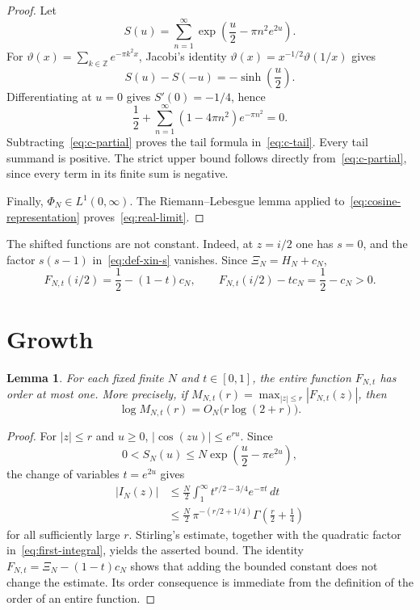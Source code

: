 \documentclass[11pt,a4paper]{amsart}
\newtheorem{lemma}[theorem]{Lemma}
\theoremstyle{remark}
\begin{document}
\begin{proof}
Let
\[
 S(u)=\sum_{n=1}^\infty\exp\!\left(\frac u2-\pi n^2e^{2u}\right).
\]
For $\vartheta(x)=\sum_{k\in\mathbb Z}e^{-\pi k^2x}$, Jacobi's identity
$\vartheta(x)=x^{-1/2}\vartheta(1/x)$ gives
\[
 S(u)-S(-u)=-\sinh\!\left(\frac u2\right).
\]
Differentiating at $u=0$ gives $S'(0)=-1/4$, hence
\[
 \frac12+\sum_{n=1}^\infty(1-4\pi n^2)e^{-\pi n^2}=0.
\]
Subtracting~\eqref{eq:c-partial} proves the tail formula
in~\eqref{eq:c-tail}.  Every tail summand is positive.  The strict upper
bound follows directly from~\eqref{eq:c-partial}, since every term in its
finite sum is negative.

Finally, $\Phi_N\in L^1(0,\infty)$.  The Riemann--Lebesgue lemma applied
to~\eqref{eq:cosine-representation} proves~\eqref{eq:real-limit}.
\end{proof}

The shifted functions are not constant.  Indeed, at $z=i/2$ one has $s=0$,
and the factor $s(s-1)$ in~\eqref{eq:def-xin-s} vanishes.  Since
$\Xi_N=H_N+c_N$,
\begin{equation}\label{eq:nonconstant}
 F_{N,t}(i/2)=\frac12-(1-t)c_N,
 \qquad
 F_{N,t}(i/2)-t c_N=\frac12-c_N>0.
\end{equation}

\section{Growth}\label{sec:growth}

\begin{lemma}\label{lem:order}
For each fixed finite $N$ and $t\in[0,1]$, the entire function $F_{N,t}$ has
order at most one.  More precisely, if
$M_{N,t}(r)=\max_{|z|\leq r}|F_{N,t}(z)|$, then
\[
 \log M_{N,t}(r)=O_N\!\bigl(r\log(2+r)\bigr).
\]
\end{lemma}

\begin{proof}
For $|z|\leq r$ and $u\geq0$,
$|\cos(zu)|\leq e^{ru}$.  Since
\[
 0<S_N(u)\leq N\exp\!\left(\frac u2-\pi e^{2u}\right),
\]
the change of variables $t=e^{2u}$ gives
\begin{align*}
 |I_N(z)|
 &\leq \frac N2\int_1^\infty
 t^{r/2-3/4}e^{-\pi t}\,dt\\
 &\leq \frac N2\,\pi^{-(r/2+1/4)}
 \Gamma\!\left(\frac r2+\frac14\right)
\end{align*}
for all sufficiently large $r$.  Stirling's estimate, together with the
quadratic factor in~\eqref{eq:first-integral}, yields the asserted bound.
The identity $F_{N,t}=\Xi_N-(1-t)c_N$ shows that adding the bounded constant
does not change the estimate.  Its order consequence is immediate from the
definition of the order of an entire function.
\end{proof}
\end{document}
